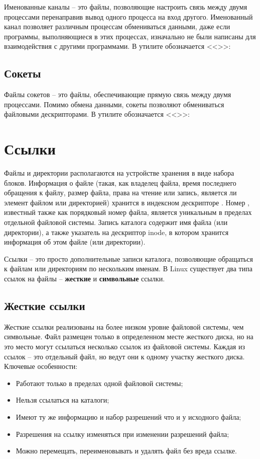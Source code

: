 Именованные каналы -- это файлы, позволяющие настроить связь между двумя процессами перенаправив вывод одного процесса на вход другого. Именованный канал позволяет различным процессам обмениваться данными, даже если программы, выполняющиеся в этих процессах, изначально не были написаны для взаимодействия с другими программами. В утилите  обозначается <<>>:


\subsection{Сокеты}

Файлы сокетов -- это файлы, обеспечивающие прямую связь между двумя процессами. Помимо обмена данными, сокеты позволяют обмениваться файловыми дескрипторами. В утилите  обозначается <<>>:


\section{Ссылки}

Файлы и директории располагаются на устройстве хранения в виде набора блоков. Информация о файле (такая, как владелец файла, время последнего обращения к файлу, размер файла, права на чтение или запись, является ли элемент файлом или директорией) хранится в индексном дескрипторе . Номер , известный также как порядковый номер файла, является уникальным в пределах отдельной файловой системы. Запись каталога содержит имя файла (или директории), а также указатель на дескриптор inode, в котором хранится информация об этом файле (или директории).

Ссылки -- это просто дополнительные записи каталога, позволяющие обращаться к файлам или директориям по нескольким именам. В Linux существует два типа ссылок на файлы -- \textbf{жесткие} и \textbf{символьные} ссылки. 

\subsection{Жесткие ссылки}

Жесткие ссылки реализованы на более низком уровне файловой системы, чем символьные. Файл размещен только в определенном месте жесткого диска, но на это место могут ссылаться несколько ссылок из файловой системы. Каждая из ссылок -- это отдельный файл, но ведут они к одному участку жесткого диска. Ключевые особенности:
\begin{itemize}
	\item Работают только в пределах одной файловой системы;
	\item Нельзя ссылаться на каталоги;
	\item Имеют ту же информацию  и набор разрешений что и у исходного файла;
	\item Разрешения на ссылку изменяться при изменении разрешений файла;
	\item Можно перемещать, переименовывать и удалять файл без вреда ссылке.
\end{itemize}

